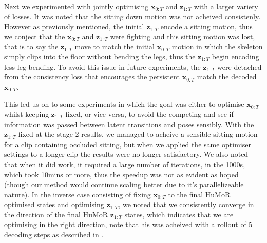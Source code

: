 Next we experimented with jointly optimising $\mathbf{x}_{0:T}$ and $\mathbf{z}_{1:T}$ with a larger variety of losses. It was noted that the sitting down motion was not acheived consistenly. However as previously mentioned, the initial $\mathbf{z}_{1:T}$ encode a sitting motion, thus we conject that the $\mathbf{x}_{0:T}$ and $\mathbf{z}_{1:T}$ were fighting and this sitting motion was lost, that is to say the $\mathbf{z}_{1:T}$ move to match the initial $\mathbf{x}_{0:T}$ motion in which the skeleton simply clips into the floor without bending the legs, thus the $\mathbf{z}_{1:T}$ begin encoding less leg bending. To avoid this issue in future experiments, the $\mathbf{z}_{1:T}$ were detached from the consistency loss that encourages the persistent $\mathbf{x}_{0:T}$ match the decoded $\mathbf{x}_{0:T}$.

This led us on to some experiments in which the goal was either to optimise $\mathbf{x}_{0:T}$ whilst keeping $\mathbf{z}_{1:T}$ fixed, or vice versa, to avoid the competing and see if information was passed between latent transitions and poses sensibly. With the $\mathbf{z}_{1:T}$ fixed at the stage 2 results, we managed to acheive a sensible sitting motion for a clip containing occluded sitting, but when we applied the same optimiser settings to a longer clip the results were no longer satisfactory. We also noted that when it did work, it required a large number of iterations, in the 1000s, which took 10mins or more, thus the speedup was not as evident as hoped (though our method would continue scaling better due to it's parallelizeable nature). In the inverse case consisting of fixing $\mathbf{x}_{0:T}$ to the final HuMoR optimised states and optimising $\mathbf{z}_{1:T}$, we noted that we consistently converge in the direction of the final HuMoR $\mathbf{z}_{1:T}$ states, which indicates that we are optimising in the right direction, note that his was acheived with a rollout of 5 decoding steps as described in .

